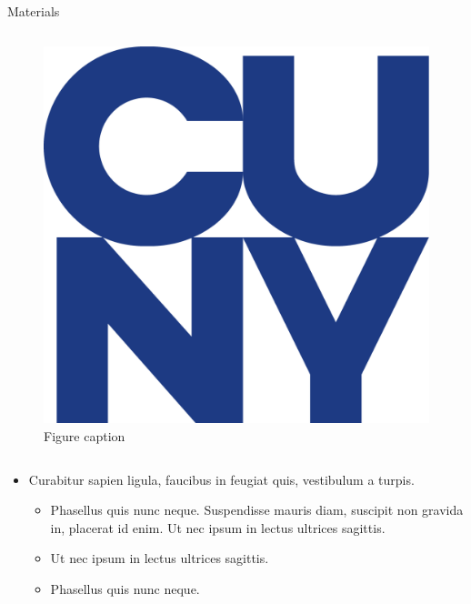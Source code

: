 \documentclass[final,hyperref={pdfpagelabels=false}]{beamer}
\begin{document}
\begin{frame}[t]
\begin{columns}[t]
\begin{column}{.465\textwidth}
\begin{block}{Materials}
\begin{columns}
                    \begin{column}{.43\textwidth} %
                        \centering
                        \begin{figure}
                            \includegraphics[width=0.8\linewidth]{logo.png}
                            \caption{Figure caption}
                        \end{figure}
                    \end{column}
                \end{columns} %

                \begin{itemize}
                    \item Curabitur sapien ligula, faucibus in feugiat quis, vestibulum a turpis.
                          \begin{itemize}
                              \item Phasellus quis nunc neque. Suspendisse mauris diam, suscipit non gravida in, placerat id enim. Ut nec ipsum in lectus ultrices sagittis.
                              \item Ut nec ipsum in lectus ultrices sagittis.
                              \item Phasellus quis nunc neque.
                          \end{itemize}
                \end{itemize}

            \end{block}


\end{column}
\end{columns}
\end{frame}
\end{document}
